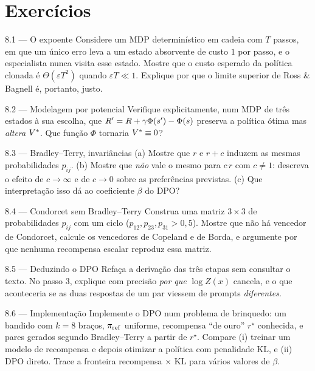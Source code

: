 \documentclass[11pt, a4paper]{article}
\newcommand{\pref}{\pol_{\mathrm{ref}}}
\begin{document}
\section{Exercícios}

\begin{exbox}{8.1 --- O expoente}
Considere um MDP determinístico em cadeia com $T$ passos, em que um único erro
leva a um estado absorvente de custo $1$ por passo, e o especialista nunca visita
esse estado. Mostre que o custo esperado da política clonada é
$\Theta(\varepsilon T^{2})$ quando $\varepsilon T \ll 1$. Explique por que o
limite superior de Ross \& Bagnell é, portanto, justo.
\end{exbox}

\begin{exbox}{8.2 --- Modelagem por potencial}
Verifique explicitamente, num MDP de três estados à sua escolha, que
$R' = R + \gamma\Phi(s')-\Phi(s)$ preserva a política ótima mas
\emph{altera} $V^{*}$. Que função $\Phi$ tornaria $V^{*} \equiv 0$?
\end{exbox}

\begin{exbox}{8.3 --- Bradley--Terry, invariâncias}
(a) Mostre que $r$ e $r+c$ induzem as mesmas probabilidades $p_{ij}$.
(b) Mostre que \emph{não} vale o mesmo para $c\,r$ com $c\ne1$: descreva o efeito
de $c\to\infty$ e de $c\to 0$ sobre as preferências previstas.
(c) Que interpretação isso dá ao coeficiente $\beta$ do DPO?
\end{exbox}

\begin{exbox}{8.4 --- Condorcet sem Bradley--Terry}
Construa uma matriz $3\times3$ de probabilidades $p_{ij}$ com um ciclo
($p_{12}, p_{23}, p_{31} > 0{,}5$). Mostre que não há vencedor de Condorcet,
calcule os vencedores de Copeland e de Borda, e argumente por que nenhuma
recompensa escalar reproduz essa matriz.
\end{exbox}

\begin{exbox}{8.5 --- Deduzindo o DPO}
Refaça a derivação das três etapas sem consultar o texto. No passo 3, explique
com precisão \emph{por que} $\log Z(x)$ cancela, e o que aconteceria se as duas
respostas de um par viessem de prompts \emph{diferentes}.
\end{exbox}

\begin{exbox}{8.6 --- Implementação}
Implemente o DPO num problema de brinquedo: um bandido com $k=8$ braços,
$\pref$ uniforme, recompensa ``de ouro'' $r^\star$ conhecida, e pares gerados
segundo Bradley--Terry a partir de $r^\star$. Compare (i) treinar um modelo de
recompensa e depois otimizar a política com penalidade KL, e (ii) DPO direto.
Trace a fronteira recompensa $\times$ KL para vários valores de $\beta$.
\end{exbox}
\end{document}
